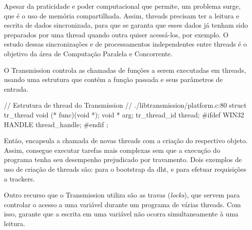 Apesar da praticidade e poder computacional que permite, um problema surge, que é o uso
de memória compartilhada. Assim, \glspl*{thread} precisam ter a leitura e escrita de
dados sincronizada, para que se garanta que esses dados já tenham sido preparados por
uma \gls*{thread} quando outra quiser acessá-los, por exemplo. O estudo dessas
sincronizações e de processamentos independentes entre \glspl*{thread} é o objetivo da
área de Computação Paralela e Concorrente.

O Transmission controla as chamadas de funções a serem executadas em \glspl*{thread},
usando uma estrutura que contém a função passada e seus parâmetros de entrada.

\begin{ccode}
// Estrutura de thread do Transmission
// ./libtransmission/platform.c:80
struct tr_thread {
    void            (* func)(void *);
    void             * arg;
    tr_thread_id       thread;
#ifdef WIN32
    HANDLE             thread_handle;
#endif
};
\end{ccode}

Então, encapsula a chamada de novas \glspl*{thread} com a criação do respectivo objeto.
Assim, consegue executar tarefas mais complexas sem que a execução do programa tenha seu
desempenho prejudicado por travamento. Dois exemplos de uso de criação de
\glspl*{thread} são: para o \gls{bootstrap} da \gls{dht}, e para efetuar requisições a
\glspl{tracker}.


Outro recurso que o Transmission utiliza são as travas (\emph{locks}), que servem para
controlar o acesso a uma variável durante um programa de várias \glspl*{thread}. Com
isso, garante que a escrita em uma variável não ocorra simultaneamente à uma leitura.

